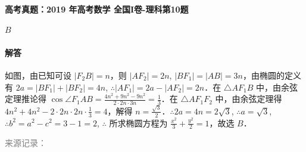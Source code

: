 \documentclass[UTF8,a4paper,11pt]{ctexart}
\newenvironment{gaokao}[1]{\par\medskip\noindent\textbf{高考真题：#1}\par\smallskip}{\par\medskip}
\begin{document}
\begin{gaokao}{2019 年高考数学 全国I卷-理科第10题}
$B$

\paragraph{解答}

如图，由已知可设 $|F_2B| = n$，则 $|AF_2| = 2n$, $|BF_1| = |AB| = 3n$，由椭圆的定义有 $2a = |BF_1| + |BF_2| = 4n$, $\therefore |AF_1| = 2a - |AF_2| = 2n$．在 $\triangle AF_1B$ 中，由余弦定理推论得 $\cos \angle F_1AB = \frac{4n^2 + 9n^2 - 9n^2}{2 \cdot 2n \cdot 3n} = \frac{1}{3}$．在 $\triangle AF_1F_2$ 中，由余弦定理得 $4n^2 + 4n^2 - 2 \cdot 2n \cdot 2n \cdot \frac{1}{3} = 4$，解得 $n = \frac{\sqrt{3}}{2}$．$\therefore 2a = 4n = 2\sqrt{3}$, $\therefore a = \sqrt{3}$, $\therefore b^2 = a^2 - c^2 = 3 - 1 = 2$, $\therefore$ 所求椭圆方程为 $\frac{x^2}{3} + \frac{y^2}{2} = 1$，故选 $B$．

\par\smallskip\textcolor{gray}{\footnotesize 来源记录：\texttt{}}

\end{gaokao}
\end{document}
